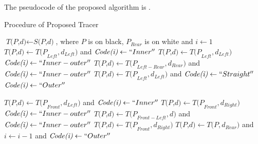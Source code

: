 
The pseudocode of the proposed algorithm is .

\begin{algorithm}
	\caption{Procedure of Proposed Tracer}
	\label{alg:proposed}
	\begin{algorithmic}[1]
	\State $\textit{T(P,d)} \gets \textit{S(P,d)}$, where $P$ is on black, $P_{Rear}$ is on white and $i \gets 1$
	\Do
			\State $\textit{T(P,d)} \gets \textit{T(P}_{Left},\textit{d}_{Left} )  $ and $\textit{Code(i)} \gets ``Inner''$
			\State $\textit{T(P,d)} \gets \textit{T(P}_{Left}, \textit{d}_{Left})$
		\Else
			\State $\textit{Code(i)} \gets ``Inner-outer''$
			\State $\textit{T(P,d)} \gets \textit{T(P}_{Left-Rear},\textit{d}_{Rear} )  $ and $\textit{Code(i)} \gets ``Inner-outer''$
		\EndIf
	\Else
			\State $\textit{T(P,d)} \gets \textit{T(P}_{Left},\textit{d}_{Left} )  $ and $\textit{Code(i)} \gets ``Straight''$
		\Else
			\State $\textit{Code(i)} \gets ``Outer''$
		\EndIf
	\EndIf


			\State $\textit{T(P,d)} \gets \textit{T(P}_{Front},\textit{d}_{Left} )  $ and $\textit{Code(i)} \gets ``Inner''$
			\State $\textit{T(P,d)} \gets \textit{T(P}_{Front}, \textit{d}_{Right})$
		\Else
			\State $\textit{Code(i)} \gets ``Inner-outer''$
			\State $\textit{T(P,d)} \gets \textit{T(P}_{Front-Left},\textit{d} )  $ and $\textit{Code(i)} \gets ``Inner-outer''$
		\EndIf
		\State $\textit{T(P,d)} \gets \textit{T(P}_{Front},\textit{d}_{Right} )  $
	\Else
		\State $\textit{T(P,d)} \gets \textit{T(P},\textit{d}_{Rear} )  $ and $i \gets i-1$ and $\textit{Code(i)} \gets ``Outer''$
	\EndIf


	\EndProcedure
	\end{algorithmic}
\end{algorithm}

